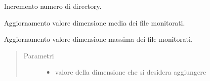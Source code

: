 \documentclass[letterpaper,10pt,italian,openany,oneside]{sphinxmanual}
\begin{document}

\begin{fulllineitems}
\label{\detokenize{code/scan:c.increaseDirectory}}
Incremento numero di directory.

\end{fulllineitems}


\begin{fulllineitems}
\label{\detokenize{code/scan:c.updateDimMedia}}
Aggiornamento valore dimensione media dei file monitorati.

\end{fulllineitems}


\begin{fulllineitems}
\label{\detokenize{code/scan:c.updateDimMax}}
Aggiornamento valore dimensione massima dei file monitorati.
\begin{quote}\begin{description}
\item[{Parametri}] \leavevmode\begin{itemize}
\item {} 
 \textendash{} valore della dimensione che si desidera aggiungere

\end{itemize}

\end{description}\end{quote}

\end{fulllineitems}

\end{document}
